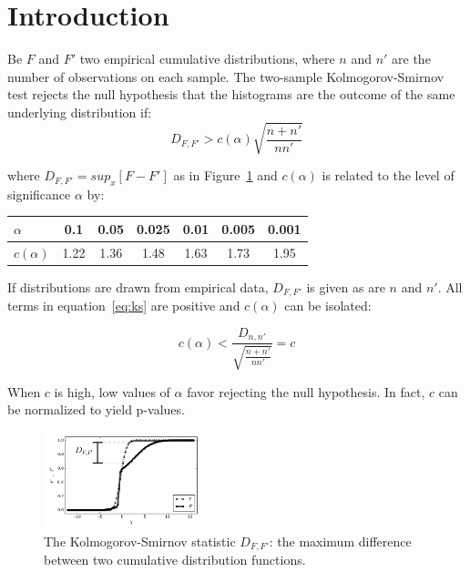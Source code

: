 \documentclass[%
	aip,
	jmp,%
	amsmath,amssymb,
	reprint,%
]{revtex4-1}
\begin{document}
\section{Introduction}\label{sec:intro}



Be $F$ and $F'$ two empirical cumulative distributions,
where $n$ and $n'$ are the number of observations on each sample.
The two-sample Kolmogorov-Smirnov test rejects the null hypothesis
that the histograms are the outcome of the same underlying distribution
if:
\begin{equation}\label{eq:ks}
D_{F,F'} > c(\alpha)\sqrt{\frac{n+n'}{nn'}}
\end{equation}

\noindent where $D_{F,F'}=sup_x[F-F']$ as in Figure~\ref{fig:dnn}
and $c(\alpha)$ is related to the level of significance $\alpha$ by:

\begin{table}[h!]
\centering
\begin{tabular}{|l||c|c|c|c|c|c|}\hline
$\alpha$    & 0.1  & 0.05 & 0.025 & 0.01 & 0.005 & 0.001 \\\hline
$c(\alpha)$ & 1.22 & 1.36 & 1.48  & 1.63 & 1.73  & 1.95  \\\hline
\end{tabular}
\end{table}

If distributions are drawn from empirical data, $D_{F,F'}$ is given as are $n$ and $n'$.
All terms in equation~\ref{eq:ks} are positive and $c(\alpha)$ can be isolated:

\begin{equation}\label{eq:ks2}
	c(\alpha) < \frac{D_{n,n'}}{\sqrt{\frac{n+n'}{nn'}}} = c
\end{equation}

When $c$ is high, low values of $\alpha$ favor rejecting the null hypothesis.
In fact, $c$ can be normalized to yield p-values.

\begin{figure}[!h]
	\centering
	\includegraphics[width=0.44\textwidth]{figs/Dnn}
	\caption{The Kolmogorov-Smirnov statistic $D_{F,F'}$: the maximum difference between
		two cumulative distribution functions.}
	\label{fig:dnn}
\end{figure}
\end{document}
